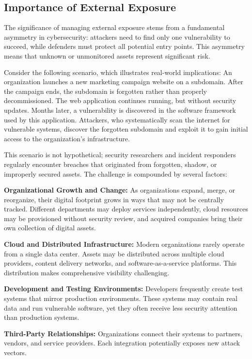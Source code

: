 \documentclass[a4paper,12pt]{report}
\begin{document}
\subsection{Importance of External Exposure}

The significance of managing external exposure stems from a fundamental asymmetry in cybersecurity: attackers need to find only one vulnerability to succeed, while defenders must protect all potential entry points. This asymmetry means that unknown or unmonitored assets represent significant risk.\hfill \break

Consider the following scenario, which illustrates real-world implications: An organization launches a new marketing campaign website on a subdomain. After the campaign ends, the subdomain is forgotten rather than properly decommissioned. The web application continues running, but without security updates. Months later, a vulnerability is discovered in the software framework used by this application. Attackers, who systematically scan the internet for vulnerable systems, discover the forgotten subdomain and exploit it to gain initial access to the organization's infrastructure.\hfill \break

This scenario is not hypothetical; security researchers and incident responders regularly encounter breaches that originated from forgotten, shadow, or improperly secured assets. The challenge is compounded by several factors:\hfill \break

\textbf{Organizational Growth and Change:} As organizations expand, merge, or reorganize, their digital footprint grows in ways that may not be centrally tracked. Different departments may deploy services independently, cloud resources may be provisioned without security review, and acquired companies bring their own collection of digital assets.\hfill \break

\textbf{Cloud and Distributed Infrastructure:} Modern organizations rarely operate from a single data center. Assets may be distributed across multiple cloud providers, content delivery networks, and software-as-a-service platforms. This distribution makes comprehensive visibility challenging.\hfill \break

\textbf{Development and Testing Environments:} Developers frequently create test systems that mirror production environments. These systems may contain real data and run vulnerable software, yet they often receive less security attention than production systems.\hfill \break

\textbf{Third-Party Relationships:} Organizations connect their systems to partners, vendors, and service providers. Each integration potentially exposes new attack vectors.\hfill \break
\end{document}

